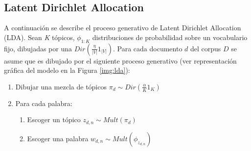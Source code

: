 \documentclass[letterpaper,12pt,oneside]{book} %
\begin{document}



\subsection{Latent Dirichlet Allocation}

A continuación se describe el proceso generativo de Latent Dirichlet Allocation (LDA). Sean \textit{K} tópicos, $\phi_{1:K}$ distribuciones de probabilidad sobre un vocabulario fijo, dibujadas por una $Dir(\frac{\eta}{|V|}1_{|V|})$. Para cada documento $d$ del corpus $D$ se asume que es dibujado por el siguiente proceso generativo (ver representación gráfica del modelo en la Figura \ref{img:lda}):
\begin{enumerate}
    \item Dibujar una mezcla de tópicos $\pi_{d}\sim Dir(\frac{\alpha}{K}1_{K})$
    \item Para cada palabra:
    \begin{enumerate}
        \item Escoger un tópico $z_{d,n}\sim Mult(\pi_{d})$
        \item Escoger una palabra $w_{d,n}\sim Mult(\phi_{z_{d,n}})$
    \end{enumerate}
\end{enumerate}
\end{document}
